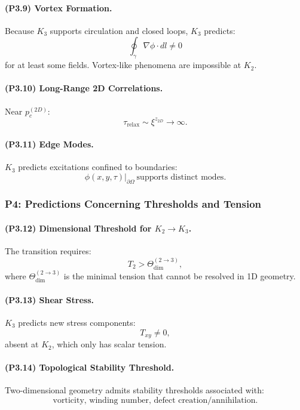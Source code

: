 \paragraph{(P3.9) Vortex Formation.}
Because $K_3$ supports circulation and closed loops, $K_3$ predicts:
\[
\oint_\gamma \nabla \phi \cdot dl \neq 0
\]
for at least some fields.
Vortex-like phenomena are impossible at $K_2$.

\paragraph{(P3.10) Long-Range 2D Correlations.}
Near $p_c^{(2D)}$:
\[
\tau_{\mathrm{relax}} \sim \xi^{z_{2D}} \to \infty.
\]

\paragraph{(P3.11) Edge Modes.}
$K_3$ predicts excitations confined to boundaries:
\[
\phi(x,y,\tau)|_{\partial\Omega} \ \text{supports distinct modes}.
\]

\subsubsection{P4: Predictions Concerning Thresholds and Tension}

\paragraph{(P3.12) Dimensional Threshold for \texorpdfstring{$K_2\to K_3$}{K_2\to K_3}.}
The transition requires:
\[
T_2 > \Theta_{\mathrm{dim}}^{(2\to3)},
\]
where $\Theta_{\mathrm{dim}}^{(2\to3)}$ is the minimal tension that cannot be
resolved in 1D geometry.

\paragraph{(P3.13) Shear Stress.}
$K_3$ predicts new stress components:
\[
T_{xy} \neq 0,
\]
absent at $K_2$, which only has scalar tension.

\paragraph{(P3.14) Topological Stability Threshold.}
Two-dimensional geometry admits stability thresholds associated with:
\[
\text{vorticity, winding number, defect creation/annihilation}.
\]

